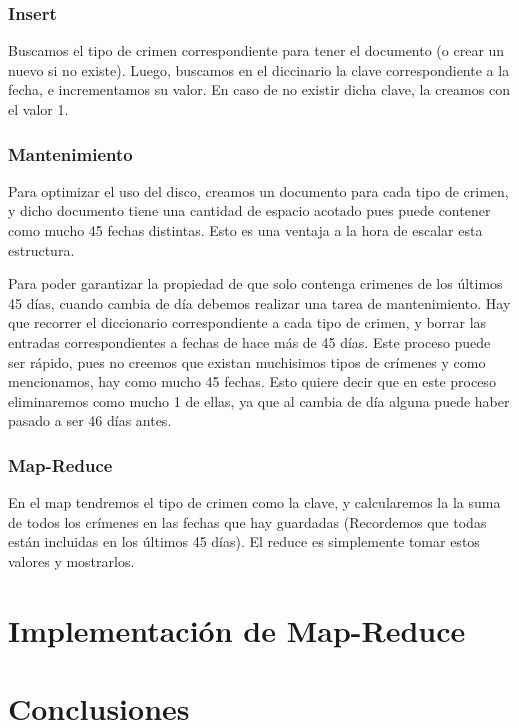 \documentclass[11pt, a4paper]{article}
\begin{document}
\subsubsection{Insert}
Buscamos el tipo de crimen correspondiente para tener el documento (o crear un nuevo si no existe). Luego, buscamos en el diccinario la clave correspondiente a la fecha, e incrementamos su valor. En caso de no existir dicha clave, la creamos con el valor 1.

\subsubsection{Mantenimiento}

Para optimizar el uso del disco, creamos un documento para cada tipo de crimen, y dicho documento tiene una cantidad de espacio acotado pues puede contener como mucho 45 fechas distintas. Esto es una ventaja a la hora de escalar esta estructura.\

Para poder garantizar la propiedad de que solo contenga crimenes de los \'ultimos 45 d\'ias, cuando cambia de d\'ia debemos realizar una tarea de mantenimiento. Hay que recorrer el diccionario correspondiente a cada tipo de crimen, y borrar las entradas correspondientes a fechas de hace más de 45 días. Este proceso puede ser r\'apido, pues no creemos que existan muchisimos tipos de cr\'imenes y como mencionamos, hay como mucho 45 fechas. Esto quiere decir que en este proceso eliminaremos como mucho 1 de ellas, ya que al cambia de d\'ia alguna puede haber pasado a ser 46 d\'ias antes.

\subsubsection{Map-Reduce}

En el map tendremos el tipo de crimen como la clave, y calcularemos la la suma de todos los crímenes en las fechas que hay guardadas (Recordemos que todas están incluidas en los últimos 45 días). El reduce es simplemente tomar estos valores y mostrarlos. \

\section{Implementaci\'on de Map-Reduce}

\section{Conclusiones}
\end{document}
